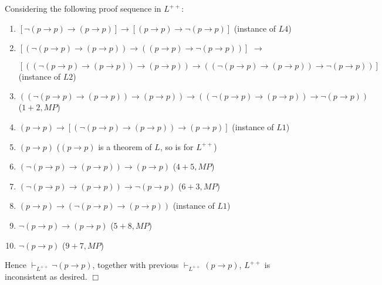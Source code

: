 \documentclass[UTF8,12pt,a4paper]{ctexart}
\begin{document}
Considering the  following proof sequence  in $L^{++}$:
\begin{enumerate}
	\item $[\neg (p \to p) \to (p \to p)]   \to [(p \to p) \to \neg (p \to p)]$ 
	\hfill  (instance of $L4$)
	
	\item $[ (\neg (p \to p) \to (p \to p))   \to ((p \to p) \to \neg (p \to p)) ]$ $\to$
	
	$[
	((\neg (p \to p) \to (p \to p)) \to (p \to p) )  \to 
	(
	(\neg (p \to p) \to (p \to p)) \to \neg (p \to p)
	)
	]$
	\hfill  (instance of $L2$)
	
	\item $((\neg (p \to p) \to (p \to p)) \to (p \to p) )  \to 
	(
	(\neg (p \to p) \to (p \to p)) \to \neg (p \to p)
	)$
	\hfill ($1 + 2, MP$)
	
	\item $(p \to p) \to [(\neg (p \to p) \to (p \to p)) \to (p \to p)]$ 
	\hfill (instance of $L1$)
	
	\item $(p \to p) $ 
	\hfill ($(p\to p)$ is a theorem of $L$, so is for $L^{++}$)
	
	\item $(\neg (p \to p) \to (p \to p)) \to (p \to p) $
	\hfill ($4+5, MP$)
	
	\item $(\neg (p \to p) \to (p \to p)) \to \neg (p \to p)$
	\hfill ($6+3, MP$)
	
	\item $(p \to p) \to ( \neg (p \to p) \to (p \to p))$ 
	\hfill (instance of $L1$)
	
	\item $ \neg (p \to p) \to (p \to p)$ 
	\hfill ($5+8, MP$)
	
	\item $\neg (p \to p)$
	\hfill ($9+7, MP$)
\end{enumerate}

\noindent 
Hence $\vdash_{L^{++}} \neg (p \to p)$, together with previous  $\vdash_{L^{++}} (p \to p)$, $L^{++}$ is inconsistent as desired.
\hfill $\Box$
\end{document}
